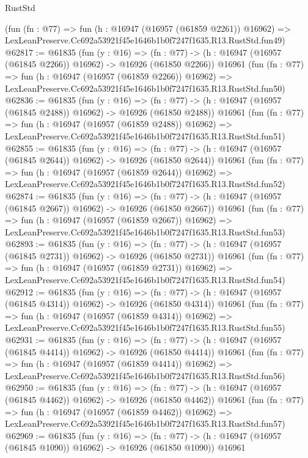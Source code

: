 \begin{lexlean}{RustStd}
\begin{coremodule}
    (fun (fn : @77) =>
    fun (h : @16947 (@16957 (@61859 @2261)) @16962) =>
    LexLeanPreserve.Cc692a53921f45e1646b1b0f7247f1635.R13.RustStd.fun49)
@62817 := @61835
    (fun (y : @16) =>
    (fn : @77) -> (h : @16947 (@16957 (@61845 @2266)) @16962) -> @16926 (@61850 @2266))
    @16961
    (fun (fn : @77) =>
    fun (h : @16947 (@16957 (@61859 @2266)) @16962) =>
    LexLeanPreserve.Cc692a53921f45e1646b1b0f7247f1635.R13.RustStd.fun50)
@62836 := @61835
    (fun (y : @16) =>
    (fn : @77) -> (h : @16947 (@16957 (@61845 @2488)) @16962) -> @16926 (@61850 @2488))
    @16961
    (fun (fn : @77) =>
    fun (h : @16947 (@16957 (@61859 @2488)) @16962) =>
    LexLeanPreserve.Cc692a53921f45e1646b1b0f7247f1635.R13.RustStd.fun51)
@62855 := @61835
    (fun (y : @16) =>
    (fn : @77) -> (h : @16947 (@16957 (@61845 @2644)) @16962) -> @16926 (@61850 @2644))
    @16961
    (fun (fn : @77) =>
    fun (h : @16947 (@16957 (@61859 @2644)) @16962) =>
    LexLeanPreserve.Cc692a53921f45e1646b1b0f7247f1635.R13.RustStd.fun52)
@62874 := @61835
    (fun (y : @16) =>
    (fn : @77) -> (h : @16947 (@16957 (@61845 @2667)) @16962) -> @16926 (@61850 @2667))
    @16961
    (fun (fn : @77) =>
    fun (h : @16947 (@16957 (@61859 @2667)) @16962) =>
    LexLeanPreserve.Cc692a53921f45e1646b1b0f7247f1635.R13.RustStd.fun53)
@62893 := @61835
    (fun (y : @16) =>
    (fn : @77) -> (h : @16947 (@16957 (@61845 @2731)) @16962) -> @16926 (@61850 @2731))
    @16961
    (fun (fn : @77) =>
    fun (h : @16947 (@16957 (@61859 @2731)) @16962) =>
    LexLeanPreserve.Cc692a53921f45e1646b1b0f7247f1635.R13.RustStd.fun54)
@62912 := @61835
    (fun (y : @16) =>
    (fn : @77) -> (h : @16947 (@16957 (@61845 @4314)) @16962) -> @16926 (@61850 @4314))
    @16961
    (fun (fn : @77) =>
    fun (h : @16947 (@16957 (@61859 @4314)) @16962) =>
    LexLeanPreserve.Cc692a53921f45e1646b1b0f7247f1635.R13.RustStd.fun55)
@62931 := @61835
    (fun (y : @16) =>
    (fn : @77) -> (h : @16947 (@16957 (@61845 @4414)) @16962) -> @16926 (@61850 @4414))
    @16961
    (fun (fn : @77) =>
    fun (h : @16947 (@16957 (@61859 @4414)) @16962) =>
    LexLeanPreserve.Cc692a53921f45e1646b1b0f7247f1635.R13.RustStd.fun56)
@62950 := @61835
    (fun (y : @16) =>
    (fn : @77) -> (h : @16947 (@16957 (@61845 @4462)) @16962) -> @16926 (@61850 @4462))
    @16961
    (fun (fn : @77) =>
    fun (h : @16947 (@16957 (@61859 @4462)) @16962) =>
    LexLeanPreserve.Cc692a53921f45e1646b1b0f7247f1635.R13.RustStd.fun57)
@62969 := @61835
    (fun (y : @16) =>
    (fn : @77) -> (h : @16947 (@16957 (@61845 @1090)) @16962) -> @16926 (@61850 @1090))
    @16961

\end{coremodule}
\end{lexlean}
